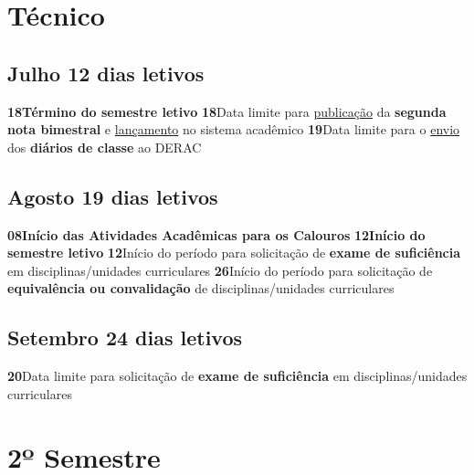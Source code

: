 \documentclass[thesis]{hmcposter}
\begin{document}
\begin{poster}
\section{\color{hmcorange}Técnico}\subsection{Julho \hfill 12 dias letivos}\textbf{18}\qquad \textbf{Término do semestre letivo} \newline \null\textbf{18}\qquad Data limite para \underline{publicação} da \textbf{segunda nota bimestral} e \underline{lançamento} no sistema acadêmico \newline \null\textbf{19}\qquad Data limite para o \underline{envio} dos \textbf{diários de classe} ao DERAC \newline \null\subsection{Agosto \hfill 19 dias letivos}\textbf{08}\qquad \textbf{Início das Atividades Acadêmicas para os Calouros} \newline \null\textbf{12}\qquad \textbf{Início do semestre letivo} \newline \null\textbf{12}\qquad Início do período para solicitação de \textbf{exame de suficiência} em disciplinas/unidades curriculares \newline \null\textbf{26}\qquad Início do período para solicitação de \textbf{equivalência ou convalidação} de disciplinas/unidades curriculares \newline \null\subsection{Setembro \hfill 24 dias letivos}\textbf{20}\qquad Data limite para solicitação de \textbf{exame de suficiência} em disciplinas/unidades curriculares \newline \null\vfill\null
\columnbreak
\section{\hfill \color{hmcorange}2º Semestre}

\end{poster}
\end{document}
